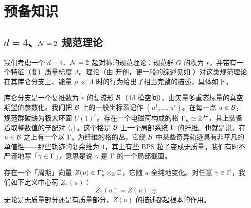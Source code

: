 \section{预备知识}
\label{sec:preliminaries}

\subsection{$d=4$、$\mathcal{N}=2$ 规范理论}

我们考虑一个 $d=4$、$\mathcal{N}=2$ 超对称的规范理论：规范群 $G$ 的秩为 $r$，并带有一个特征（复）质量标度 $\Lambda$。\SW 理论（由 \cite{Seiberg:1994rs,Seiberg:1994aj} 开创，更一般的综述见如 \cite{Lerche:1997sm,Freed:1997dp,ias-volumes}）对这类规范理论在其库仑分支上、能量 $\mu \ll \Lambda$ 时的行为给出了相当完整的描述，具体如下。

库仑分支是一个复维数为 $r$ 的复流形 $\mathcal{B}$（4d 模空间），由矢量多重态标量的真空期望值参数化。我们把 $\mathcal{B}$ 上的一般坐标系记作 $(u^1, \dots, u^r)$。在每一点 $u \in \mathcal{B}$，规范群破缺为极大环面 $U(1)^r$。存在一个电磁荷构成的格 $\Gamma_u \simeq \mathbb{Z}^{2r}$，其上装备着取整数值的辛配对 $\langle , \rangle$。这个格是 $\mathcal{B}$ 上一个局部系统 $\Gamma$ 的纤维。也就是说，在 $u \in \mathcal{B}$ 之上有一个以 $\Gamma_u$ 为纤维的格的丛，它绕 $\mathcal{B}$ 中某些奇异轨迹具有非平凡的单值性——那些轨迹的复余维为 $1$，其上有些 BPS 粒子变成无质量。我们有时不严谨地写「$\gamma \in \Gamma$」，意思是说 $\gamma$ 是 $\Gamma$ 的一个局部截面。

存在一个「周期」向量 $Z(u) \in \Gamma_u^* \otimes_{\mathbb{Z}} \mathbb{C}$，它随 $u$ 全纯地变化。对任意 $\gamma \in \Gamma$，我们如下定义中心荷 $Z_\gamma(u)$：
\begin{equation}
Z_\gamma(u) = Z(u) \cdot \gamma.
\end{equation}
无论是无质量部分还是有质量部分，$Z(u)$ 的描述都起根本的作用。

